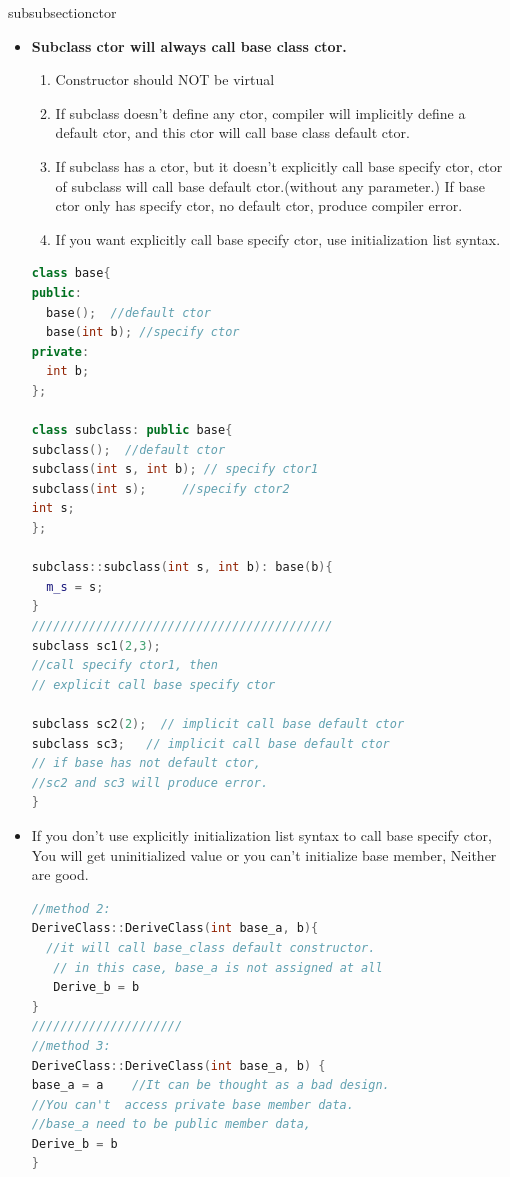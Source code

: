 \documentclass[a4paper,12pt,twoside]{book}
\begin{document}
subsubsection{ctor}
\begin{itemize}

\item  \textbf{Subclass ctor will always call base class ctor.}

\begin{enumerate}
\item Constructor should NOT be virtual
\item If subclass doesn't define any ctor, compiler will implicitly define a default ctor, and this ctor will call base class default ctor.
\item If subclass has a ctor, but it doesn't explicitly call base specify ctor, ctor of subclass will call base default ctor.(without any parameter.) If base ctor only has specify ctor, no default ctor, produce compiler error.
\item If you want explicitly call base specify ctor, use initialization list syntax.

\end{enumerate}

\begin{lstlisting}[frame=single, language=c++]
class base{
public:
  base();  //default ctor
  base(int b); //specify ctor
private:
  int b;
};

class subclass: public base{
subclass();  //default ctor
subclass(int s, int b); // specify ctor1
subclass(int s);     //specify ctor2
int s;
};

subclass::subclass(int s, int b): base(b){
  m_s = s;
}
//////////////////////////////////////////
subclass sc1(2,3);
//call specify ctor1, then
// explicit call base specify ctor

subclass sc2(2);  // implicit call base default ctor
subclass sc3;   // implicit call base default ctor
// if base has not default ctor,
//sc2 and sc3 will produce error.
}
\end{lstlisting}
\item If you don't use  explicitly initialization list syntax to call base specify ctor, You will get uninitialized value or you can't initialize base member, Neither are good.
\begin{lstlisting}[frame=single, language=c++]
//method 2:
DeriveClass::DeriveClass(int base_a, b){
  //it will call base_class default constructor.
   // in this case, base_a is not assigned at all
   Derive_b = b
}	
/////////////////////
//method 3:
DeriveClass::DeriveClass(int base_a, b) {
base_a = a    //It can be thought as a bad design.
//You can't  access private base member data.
//base_a need to be public member data,
Derive_b = b
}
\end{lstlisting}


\end{itemize}
\end{document}
